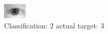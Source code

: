 \begin{figure}[h!]
\begin{center}
\includegraphics[width=0.60\columnwidth]{figures/ID1124_class_2_target_3.png}
\end{center}
\caption{ Classification: 2 actual target: 3}
\label{fig:ID1124_class_2_target_3}
\end{figure}
